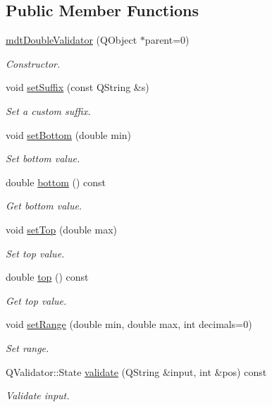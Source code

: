 \subsection*{Public Member Functions}
\begin{DoxyCompactItemize}
\item 
\hyperlink{classmdt_double_validator_a4b1ee52feff69d9809caa47dfdda43f6}{mdt\-Double\-Validator} (Q\-Object $\ast$parent=0)
\begin{DoxyCompactList}\small\item\em Constructor. \end{DoxyCompactList}\item 
void \hyperlink{classmdt_double_validator_a9741c74656a66eb9376e230c67d1e39a}{set\-Suffix} (const Q\-String \&s)
\begin{DoxyCompactList}\small\item\em Set a custom suffix. \end{DoxyCompactList}\item 
void \hyperlink{classmdt_double_validator_a9cd93164abc582ef7ffe7a856e52cd9f}{set\-Bottom} (double min)
\begin{DoxyCompactList}\small\item\em Set bottom value. \end{DoxyCompactList}\item 
double \hyperlink{classmdt_double_validator_a4dd214c184264cbe0a7507982d843ca5}{bottom} () const 
\begin{DoxyCompactList}\small\item\em Get bottom value. \end{DoxyCompactList}\item 
void \hyperlink{classmdt_double_validator_ac063ca06299ee123cb05bfb6d64d78cf}{set\-Top} (double max)
\begin{DoxyCompactList}\small\item\em Set top value. \end{DoxyCompactList}\item 
double \hyperlink{classmdt_double_validator_a038ad17fe42138b70f91ba34dafdda09}{top} () const 
\begin{DoxyCompactList}\small\item\em Get top value. \end{DoxyCompactList}\item 
void \hyperlink{classmdt_double_validator_ac8f9282902ae5a54bba7e8feb262ae3f}{set\-Range} (double min, double max, int decimals=0)
\begin{DoxyCompactList}\small\item\em Set range. \end{DoxyCompactList}\item 
Q\-Validator\-::\-State \hyperlink{classmdt_double_validator_a45b3133233d99ef2a46028eda87bad4b}{validate} (Q\-String \&input, int \&pos) const 
\begin{DoxyCompactList}\small\item\em Validate input. \end{DoxyCompactList}\end{DoxyCompactItemize}


